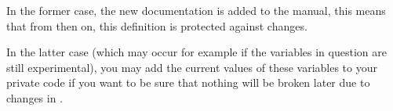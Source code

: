 In the former case, the new documentation is added to the {\GAP} manual,
this means that from then on, this definition is protected against
changes.

In the latter case (which may occur for example if the variables
in question are still experimental), you may add the current
values of these variables to your private code if you want to
be sure that nothing will be broken later due to changes in {\GAP}.



